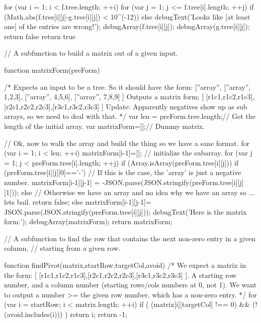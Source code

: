 \documentclass{ximera}
\begin{document}
\begin{javascript}
{    for (var i = 1; i < f.tree.length; ++i) {
        for (var j = 1; j <= f.tree[i].length; ++j) {
            if (Math.abs(f.tree[i][j]-g.tree[i][j]) < 10^(-12)) {
            } else {
                debugText('Looks like [at least one] of the entries are wrong!');
                debugArray(f.tree[i][j]);
                debugArray(g.tree[i][j]);
                return false
            }
        }
    }
return true
}


// A subfunction to build a matrix out of a given input.

function matrixForm(preForm) {
    /*
        Expects an input to be a tree. So it should have the form:
            [''array'', [''array'', 1,2,3], [''array'', 4,5,6], [''array'', 7,8,9] ]  
        Outputs a matrix form; [ [r1c1,r1c2,r1c3],[r2c1,r2c2,r2c3],[r3c1,r3c2,r3c3] ]
        Update: Apparently negatives show up as sub arrays, so we need to deal with that.
    */
    var len = preForm.tree.length;// Get the length of the initial array.
    var matrixForm=[];// Dummy matrix.
    
    // Ok, now to walk the array and build the thing so we have a sane format.
    for (var i = 1; i < len; ++i) {
        matrixForm[i-1]=[]; // initialize the subarray.
        for (var j = 1; j < preForm.tree[i].length; ++j) {
            if (Array.isArray(preForm.tree[i][j])) {
                if (preForm.tree[i][j][0]=='-'){
                    // If this is the case, the 'array' is just a negative number.
                    matrixForm[i-1][j-1] = -JSON.parse(JSON.stringify(preForm.tree[i][j][1]));
                } else {
                    // Otherwise we have an array and no idea why we have an array so ... lets bail.
                    return false;
                }
            } else {
            matrixForm[i-1][j-1]= JSON.parse(JSON.stringify(preForm.tree[i][j]));
            }
        }
    }
    debugText('Here is the matrix form:');
    debugArray(matrixForm);
    return matrixForm;
}



// A subfunction to find the row that contains the next non-zero entry in a given column, 
//  starting from a given row.

function findPivot(matrix,startRow,targetCol,avoid) {
    /*
        We expect a matrix in the form: [ [r1c1,r1c2,r1c3],[r2c1,r2c2,r2c3],[r3c1,r3c2,r3c3] ].
            A starting row number, and a column number (starting rows/cols numbers at 0, not 1).
        We want to output a number >= the given row number, which has a non-zero entry.
    */
    for (var i = startRow; i < matrix.length; ++i) {
        if ( (matrix[i][targetCol] !== 0) && (!(avoid.includes(i))) ) {
            return i;
        }
    }
    return -1;
}


\end{javascript}
\end{document}
